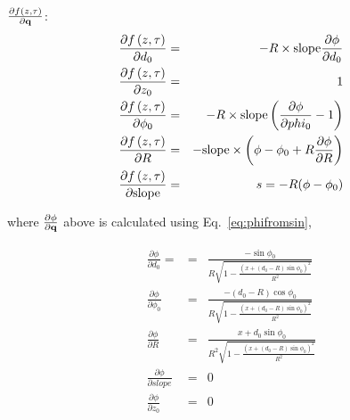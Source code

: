 \documentclass{article}
\def\slope{\ensuremath{\mathrm{slope}}}
\def\vec#1{\ensuremath{\mathrm{\bf #1}}}
\def\qvec{\ensuremath{\mathrm{\bf q}}}
\def\partder#1#2{\ensuremath{\frac{\partial #1}{\partial #2}}}
\begin{document}
$\partder{f\left(z,\vec{\tau} \right)}{\qvec}$:
\begin{eqnarray}
\partder{f\left(z,\vec{\tau} \right)}{d_0} &=& -R\times\slope\partder{\phi}{d_0} \nonumber  \\
\partder{f\left(z,\vec{\tau} \right)}{z_0} &=& 1 \nonumber \\
\partder{f\left(z,\vec{\tau} \right)}{\phi_0} &=& -R\times\slope \left( \partder{\phi}{phi_0}-1 \right) \nonumber  \\
\partder{f\left(z,\vec{\tau} \right)}{R} &=& -\slope\times \left( \phi - \phi_0 + R\partder{\phi}{R} \right) \nonumber  \\
\partder{f\left(z,\vec{\tau} \right)}{\slope} &=& s = -R(\phi -\phi_0)
\end{eqnarray}

where $\partder{\phi}{\qvec}$ above is calculated using Eq.~\ref{eq:phifromsin},

\begin{eqnarray}
\partder{\phi}{d_0} = &=& \frac{-\sin\phi_0}{R\sqrt{1 - \frac{\left(x + (d_0 - R) \sin\phi_0 \right)^2 }{R^2} }} \nonumber \\
\partder{\phi}{\phi_0} &=& \frac{-\left( d_0 - R \right) \cos\phi_0}{R\sqrt{1-\frac{\left(x+(d_0-R)\sin\phi_0\right)^2}{R^2}}} \nonumber \\
\partder{\phi}{R} &=& \frac{x+d_0 \sin\phi_0}{R^2 \sqrt{1-\frac{\left( x+(d_0-R) \sin\phi_0 \right)^2}{R^2}}} \nonumber \\
\partder{\phi}{slope} &=& 0 \nonumber \\
\partder{\phi}{z_0} &=& 0
\end{eqnarray}
\end{document}
